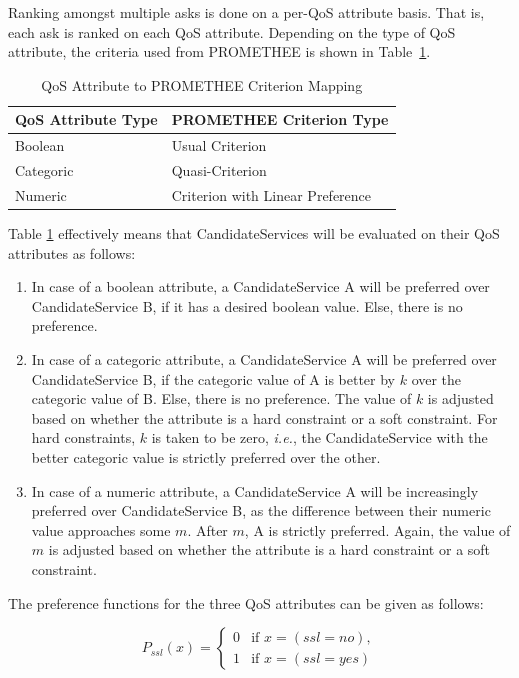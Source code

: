 \documentclass[10pt,journal,compsoc]{IEEEtran}
\begin{document}
Ranking amongst multiple asks is done on a per-QoS attribute basis. That is, each ask is ranked on each QoS attribute. Depending on the type of QoS attribute, the criteria used from PROMETHEE is shown in Table~\ref{tbl:qos_promethee_mapping}.

\begin{table}
\centering
\begin{tabular}{ll}
\toprule
QoS Attribute Type & PROMETHEE Criterion Type \\
\midrule
Boolean & Usual Criterion \\
Categoric & Quasi-Criterion \\
Numeric & Criterion with Linear Preference \\
\bottomrule
\end{tabular}
\caption{QoS Attribute to PROMETHEE Criterion Mapping \label{tbl:qos_promethee_mapping}}
\end{table}

Table \ref{tbl:qos_promethee_mapping} effectively means that CandidateServices will be evaluated on their QoS attributes as follows:
	\begin{enumerate}
		\item In case of a boolean attribute, a CandidateService A will be preferred over CandidateService B, if it has a desired boolean value. Else, there is no preference.
		\item In case of a categoric attribute, a CandidateService A will be preferred over CandidateService B, if the categoric value of A is better by $k$ over the categoric value of B. Else, there is no preference. The value of $k$ is adjusted based on whether the attribute is a hard constraint or a soft constraint. For hard constraints, $k$ is taken to be zero, \textit{i.e.}, the CandidateService with the better categoric value is strictly preferred over the other. 
		\item In case of a numeric attribute, a CandidateService A will be increasingly preferred over CandidateService B, as the difference between their numeric value approaches some $m$. After $m$, A is strictly preferred. Again, the value of $m$ is adjusted based on whether the attribute is a hard constraint or a soft constraint. 
	\end{enumerate}
	
	The preference functions for the three QoS attributes can be given as follows:
	
	\begin{equation}
		P_{ssl}(x) = \begin{cases} 0 &\mbox{if } x = (ssl=no),\\ 
							1 &\mbox{if } x = (ssl=yes) \end{cases}
			\label{pref_ssl}
	\end{equation}
\end{document}

